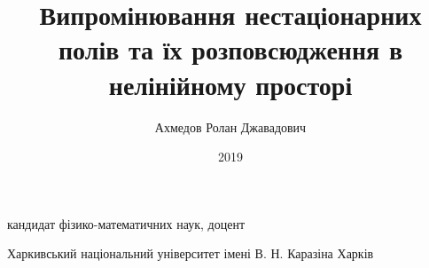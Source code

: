 \documentclass{vakthesis}
\theoremstyle{plain}
\theoremstyle{definition}
\theoremstyle{remark}
\begin{document}
\title{Випромінювання нестаціонарних полів та їх розповсюдження в 
нелінійному просторі}

\author{Ахмедов Ролан Джавадович}

{кандидат фізико-математичних наук, доцент}



\institution
{Харкивський національний університет імені В. Н. Каразіна}
{Харків}

\date{2019}

\maketitle

\tableofcontents










\appendix




\end{document}
